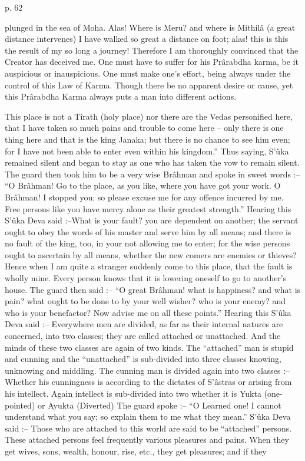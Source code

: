  

p. 62

 

plunged in the sea of Moha. Alas! Where is Meru? and where is Mithilâ (a great distance intervenes) I have walked so great a distance on foot; alas! this is this the result of my so long a journey! Therefore I am thoroughly convinced that the Creator has deceived me. One must have to suffer for his Prârabdha karma, be it auspicious or inauspicious. One must make one’s effort, being always under the control of this Law of Karma. Though there be no apparent desire or cause, yet this Prârabdha Karma always puts a man into different actions.

 

This place is not a Tîrath (holy place) nor there are the Vedas personified here, that I have taken so much pains and trouble to come here -- only there is one thing here and that is the king Janaka; but there is no chance to see him even; for I have not been able to enter even within his kingdom.” Thus saying, S’ûka remained silent and began to stay as one who has taken the vow to remain silent. The guard then took him to be a very wise Brâhman and spoke in sweet words :-- “O Brâhman! Go to the place, as you like, where you have got your work. O Brâhman! I stopped you; so please excuse me for any offence incurred by me. Free persons like you have mercy alone as their greatest strength.” Hearing this S’ûka Deva said :--What is your fault? you are dependent on another; the servant ought to obey the words of his master and serve him by all means; and there is no fault of the king, too, in your not allowing me to enter; for the wise persons ought to ascertain by all means, whether the new comers are enemies or thieves? Hence when I am quite a stranger suddenly come to this place, that the fault is wholly mine. Every person knows that it is lowering oneself to go to another's house. The guard then said :-- “O great Brâhman! what is happiness? and what is pain? what ought to be done to by your well wisher? who is your enemy? and who is your benefactor? Now advise me on all these points.” Hearing this S’ûka Deva said :-- Everywhere men are divided, as far as their internal natures are concerned, into two classes; they are called attached or unattached. And the minds of these two classes are again of two kinds. The “attached” man is stupid and cunning and the “unattached” is sub-divided into three classes knowing, unknowing and middling. The cunning man is divided again into two classes :-- Whether his cunningness is according to the dictates of S’âstras or arising from his intellect. Again intellect is sub-divided into two whether it is Yukta (one-pointed) or Ayukta (Diverted) The guard spoke :-- “O Learned one! I cannot understand what you say; so explain them to me what they mean.” S’ûka Deva said :-- Those who are attached to this world are said to be “attached” persons. These attached persons feel frequently various pleasures and pains. When they get wives, sons, wealth, honour, rise, etc., they get pleasures; and if they

